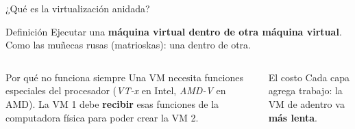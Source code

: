 \documentclass[aspectratio=169,10pt,c]{beamer}
\begin{document}
\begin{frame}{¿Qué es la virtualización anidada?}
\begin{block}{Definición}
\small Ejecutar una \textbf{máquina virtual dentro de otra máquina virtual}. Como las muñecas rusas (matrioskas): una dentro de otra.
\end{block}
\begin{columns}[c,onlytextwidth]
\centering
{}
\begin{exampleblock}{Por qué no funciona siempre}
\small Una VM necesita funciones especiales del procesador (\emph{VT-x} en Intel, \emph{AMD-V} en AMD). La VM 1 debe \textbf{recibir} esas funciones de la computadora física para poder crear la VM 2.
\end{exampleblock}
\begin{alertblock}{El costo}
\small Cada capa agrega trabajo: la VM de adentro va \textbf{más lenta}.
\end{alertblock}
\end{columns}
\end{frame}
\end{document}
